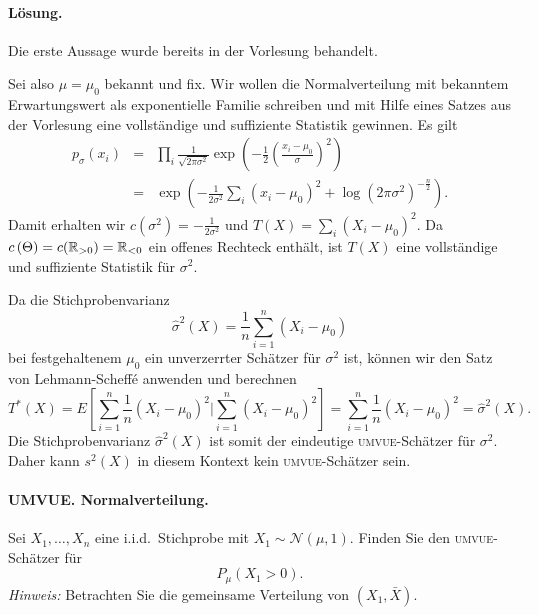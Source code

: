 \paragraph*{Lösung.} 
Die erste Aussage wurde bereits in der Vorlesung behandelt. 

Sei also $\mu=\mu_0$ bekannt und fix.  Wir wollen die Normalverteilung mit
bekanntem Erwartungswert als exponentielle Familie schreiben und mit Hilfe
eines Satzes aus der Vorlesung eine vollständige und suffiziente Statistik
gewinnen. Es gilt
\begin{eqnarray}
	p_\sigma(x_i) &=& \prod_i \frac{1}{\sqrt{2 \pi \sigma^2}} 
	\exp\left( -\frac{1}{2} \left( \frac{x_i - \mu_0}{\sigma}\right)^2 \right) \\
	&=& \exp\left( -\frac{1}{2 \sigma^2} \sum_{i}^{} \left( x_i - \mu_0 \right)^2 +
		\log\left( 2 \pi \sigma^2 \right)^{-\frac{n}{2}}  \right).
\end{eqnarray}
Damit erhalten wir $c(\sigma^2) = -\frac{1}{2 \sigma^2}$ und $T(X) = \sum_{i}^{} \left( X_i - \mu_0 \right)^2$.
Da $c\left( \Theta \right) = c(\mathbb R_{>0})= \mathbb R_{<0}$ ein offenes Rechteck enthält, ist $T\left( X \right)$
eine vollständige und suffiziente Statistik für $\sigma^2$.

Da die Stichprobenvarianz
\begin{equation}
	\hat\sigma^2(X) = \frac{1}{n} \sum_{i=1}^{n} (X_i - \mu_0)
\end{equation}
bei festgehaltenem $\mu_0$ ein unverzerrter Schätzer für $\sigma^2$ ist, können 
wir den Satz von Lehmann-Scheff\'e anwenden und berechnen 
\begin{equation}
	T^*\left( X \right) = E\left[ \sum_{i=1}^{n} \frac{1}{n} \left( X_i-\mu_0 \right)^2 | \sum_{i=1}^{n} \left( X_i-\mu_0 \right)^2 \right] = \sum_{i=1}^{n} \frac{1}{n} \left( X_i-\mu_0 \right)^2 = \hat\sigma^2(X).
\end{equation}
Die Stichprobenvarianz $\hat\sigma^2(X)$ ist somit der eindeutige \textsc{umvue}-Schätzer
für $\sigma^2$. Daher kann $s^2(X)$ in diesem Kontext kein
\textsc{umvue}-Schätzer sein.







\paragraph{UMVUE. Normalverteilung. } Sei $X_1,\ldots,X_n$ eine i.i.d.\
Stichprobe mit $X_1\sim\mathcal N(\mu,1)$. Finden Sie den 
\textsc{umvue}-Schätzer für
\begin{equation}
	P_\mu (X_1>0).
\end{equation}
\emph{Hinweis:} Betrachten Sie die gemeinsame Verteilung von $(X_1,\bar X)$.

